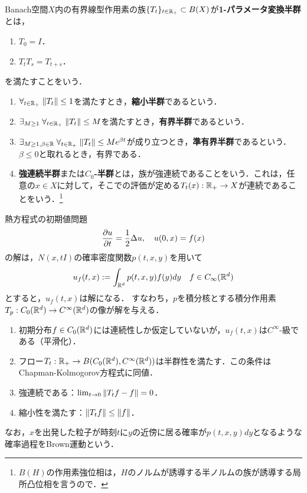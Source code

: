 \documentclass[uplatex,dvipdfmx]{jsreport}
\begin{document}
\begin{definition}
    Banach空間$X$内の有界線型作用素の族$\{T_t\}_{t\in\mathbb{R}_+}\subset B(X)$が\textbf{1-パラメータ変換半群}とは，
    \begin{enumerate}
        \item $T_0=I$．
        \item $T_tT_s=T_{t+s}$．
    \end{enumerate}
    を満たすことをいう．
    \begin{enumerate}
        \item $\forall_{t\in\mathbb{R}_+}\;\|T_t\|\le1$を満たすとき，\textbf{縮小半群}であるという．
        \item $\exists_{M\ge1}\;\forall_{t\in\mathbb{R}_+}\;\|T_t\|\le M$を満たすとき，\textbf{有界半群}であるという．
        \item $\exists_{M\ge1,\beta\in\mathbb{R}}\;\forall_{t\in\mathbb{R}_+}\;\|T_t\|\le Me^{\beta t}$が成り立つとき，\textbf{準有界半群}であるという．$\beta\le0$と取れるとき，有界である．
        \item \textbf{強連続半群}または\textbf{$C_0$-半群}とは，族が強連続であることをいう．これは，任意の$x\in X$に対して，そこでの評価が定める$T_t(x):\mathbb{R}_+\to X$が連続であることをいう．\footnote{$B(H)$の作用素強位相は，$H$のノルムが誘導する半ノルムの族が誘導する局所凸位相を言うので．}
    \end{enumerate}
\end{definition}

\begin{example}[熱方程式の解の半群]
    熱方程式の初期値問題
    \[\frac{\partial u}{\partial t}=\frac{1}{2}\Delta u,\quad u(0,x)=f(x)\]
    の解は，$N(x,tI)$の確率密度関数$p(t,x,y)$を用いて
    \[u_f(t,x):=\int_{\mathbb{R}^d}p(t,x,y)f(y)dy\quad f\in C_\infty(\mathbb{R}^d)\]
    とすると，$u_f(t,x)$は解になる．
    すなわち，$p$を積分核とする積分作用素$T_p:C_0(\mathbb{R}^d)\to C^\infty(\mathbb{R}^d)$の像が解を与える．
    \begin{enumerate}
        \item 初期分布$f\in C_0(\mathbb{R}^d)$には連続性しか仮定していないが，$u_f(t,x)$は$C^\infty$-級である（平滑化）．
        \item フロー$T_t:\mathbb{R}_+\to B(C_0(\mathbb{R}^d),C^\infty(\mathbb{R}^d))$は半群性を満たす．この条件はChapman-Kolmogorov方程式に同値．
        \item 強連続である：$\lim_{t\to0}\|T_tf-f\|=0$．
        \item 縮小性を満たす：$\|T_tf\|\le\|f\|$．
    \end{enumerate}
    なお，$x$を出発した粒子が時刻$t$に$y$の近傍に居る確率が$p(t,x,y)dy$となるような確率過程をBrown運動という．
\end{example}
\end{document}
